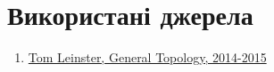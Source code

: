 \documentclass[a4paper, 10pt]{article}
\theoremstyle{theoremdd}
\newtheorem{definition}[theorem]{Definition}
\begin{document}
\newpage

\section*{Використані джерела}
\begin{enumerate}
\item \href{https://www.maths.ed.ac.uk/~tl/topology/topology_notes.pdf}{Tom Leinster, General Topology, 2014-2015}
\end{enumerate}

\iffalse
\begin{definition}
Задано $(X,\tau)$ -- топологічний простір.\\
Ми будемо це називати \textbf{гаусдорфовим простором}, якщо
\begin{align*}
\forall x,y \in X: x \neq y: \exists U_x,U_y \text{ -- відкриті околи точок } x,y: U_x \cap U_y = \emptyset
\end{align*}
\end{definition}
\fi
\end{document}
